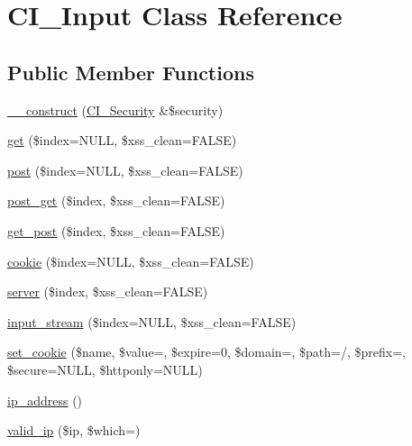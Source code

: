 \hypertarget{class_c_i___input}{}\section{C\+I\+\_\+\+Input Class Reference}
\label{class_c_i___input}
\subsection*{Public Member Functions}
\begin{DoxyCompactItemize}
\item 
\mbox{\hyperlink{class_c_i___input_af22022547aa95d3936073a088229ad97}{\+\_\+\+\_\+construct}} (\mbox{\hyperlink{class_c_i___security}{C\+I\+\_\+\+Security}} \&\$security)
\item 
\mbox{\hyperlink{class_c_i___input_a7f3fe35f15454cbad4f12fd8a0e195e1}{get}} (\$index=N\+U\+LL, \$xss\+\_\+clean=F\+A\+L\+SE)
\item 
\mbox{\hyperlink{class_c_i___input_a50ac0e340a9da4d85cc976e78d99a7c0}{post}} (\$index=N\+U\+LL, \$xss\+\_\+clean=F\+A\+L\+SE)
\item 
\mbox{\hyperlink{class_c_i___input_afd9b75cb1f81ee328dd760104d7b381d}{post\+\_\+get}} (\$index, \$xss\+\_\+clean=F\+A\+L\+SE)
\item 
\mbox{\hyperlink{class_c_i___input_a66d6fe8b72654a5967aa619ba2110d7d}{get\+\_\+post}} (\$index, \$xss\+\_\+clean=F\+A\+L\+SE)
\item 
\mbox{\hyperlink{class_c_i___input_a9cff2411a5c6cf6da425ebc7d47448c9}{cookie}} (\$index=N\+U\+LL, \$xss\+\_\+clean=F\+A\+L\+SE)
\item 
\mbox{\hyperlink{class_c_i___input_a59a1d5ca4ea86e4a0d1db214348f1b07}{server}} (\$index, \$xss\+\_\+clean=F\+A\+L\+SE)
\item 
\mbox{\hyperlink{class_c_i___input_a65d90b3e8b3446b41b2e28f51bb224b6}{input\+\_\+stream}} (\$index=N\+U\+LL, \$xss\+\_\+clean=F\+A\+L\+SE)
\item 
\mbox{\hyperlink{class_c_i___input_a8256f11d4b41bc4d736e3959251d68de}{set\+\_\+cookie}} (\$name, \$value=\textquotesingle{}\textquotesingle{}, \$expire=0, \$domain=\textquotesingle{}\textquotesingle{}, \$path=\textquotesingle{}/\textquotesingle{}, \$prefix=\textquotesingle{}\textquotesingle{}, \$secure=N\+U\+LL, \$httponly=N\+U\+LL)
\item 
\mbox{\hyperlink{class_c_i___input_aec2f772317b4fb79cc696412c2e455c3}{ip\+\_\+address}} ()
\item 
\mbox{\hyperlink{class_c_i___input_a10da42e1fde6cd5b335efcd2338c4ff8}{valid\+\_\+ip}} (\$ip, \$which=\textquotesingle{}\textquotesingle{})

\end{DoxyCompactItemize}
